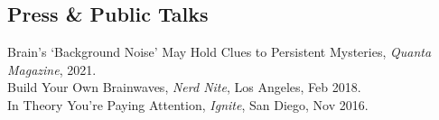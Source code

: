 \documentclass[margin,line]{res}
\newenvironment{list1}{
    \begin{list}{\ding{113}}{%
        \setlength{\itemsep}{0in}
        \setlength{\parsep}{0in} \setlength{\parskip}{0in}
        \setlength{\topsep}{0in} \setlength{\partopsep}{0in}
        \setlength{\leftmargin}{0.17in}}}{
    \end{list}}
\begin{document}
\begin{resume}



\vspace{-.2cm}
\section{\sc Press \& Public Talks}
Brain's `Background Noise' May Hold Clues to Persistent Mysteries, \emph{Quanta Magazine}, 2021. \\
Build Your Own Brainwaves, \emph{Nerd Nite}, Los Angeles, Feb 2018. \\
In Theory You're Paying Attention, \emph{Ignite}, San Diego, Nov 2016. \\
    
\vspace{-.5cm} 

\end{resume}
\end{document}
